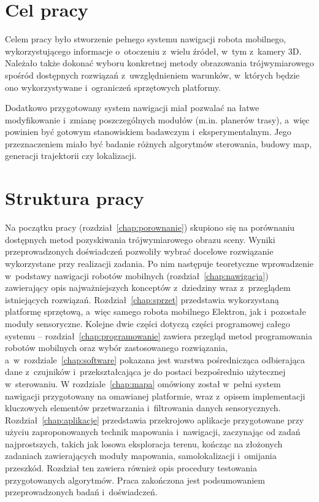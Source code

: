 \section{Cel pracy}

Celem pracy było stworzenie pełnego systemu nawigacji robota mobilnego,
wykorzystującego informacje o~otoczeniu z~wielu źródeł, w~tym z~kamery 3D.
Należało także dokonać wyboru konkretnej metody obrazowania trójwymiarowego
spośród dostępnych rozwiązań z~uwzględnieniem warunków, w~których będzie ono
wykorzystywane i~ograniczeń sprzętowych platformy.

Dodatkowo przygotowany system nawigacji miał pozwalać na łatwe modyfikowanie
i~zmianę poszczególnych modułów (m.in. planerów trasy), a~więc powinien być
gotowym stanowiskiem badawczym i~eksperymentalnym. Jego przeznaczeniem miało
być badanie różnych algorytmów sterowania, budowy map, generacji trajektorii czy lokalizacji.


\section{Struktura pracy}

Na początku pracy (rozdział~\ref{chap:porownanie}) skupiono się na porównaniu
dostępnych metod pozyskiwania trójwymiarowego
obrazu sceny. Wyniki przeprowadzonych doświadczeń pozwoliły wybrać docelowe rozwiązanie
wykorzystane przy realizacji zadania. Po nim następuje
teoretyczne wprowadzenie w~podstawy nawigacji robotów mobilnych (rozdział~\ref{chap:nawigacja})
zawierający opis najważniejszych konceptów z~dziedziny wraz z~przeglądem istniejących
rozwiązań. Rozdział~\ref{chap:sprzet} przedstawia wykorzystaną platformę sprzętową,
a~więc samego robota mobilnego Elektron, jak i~pozostałe moduły sensoryczne. Kolejne
dwie części dotyczą części programowej całego systemu -- rozdział~\ref{chap:programowanie}
zawiera przegląd metod programowania robotów mobilnych oraz wybór zastosowanego rozwiązania,
a~w~rozdziale~\ref{chap:software} pokazana jest warstwa pośrednicząca odbierająca
dane z~czujników i~przekształcająca je do postaci bezpośrednio użytecznej w~sterowaniu.
W rozdziale~\ref{chap:mapa} omówiony został w~pełni system nawigacji przygotowany
na omawianej platformie, wraz z~opisem implementacji kluczowych elementów
przetwarzania i~filtrowania danych sensorycznych.
Rozdział~\ref{chap:aplikacje} przedstawia przekrojowo aplikacje przygotowane
przy użyciu zaproponowanych technik mapowania i~nawigacji, zaczynając od zadań
najprostszych, takich jak losowa eksploracja terenu, kończąc na złożonych zadaniach
zawierających moduły mapowania, samolokalizacji i~omijania przeszkód. Rozdział ten
zawiera również opis procedury testowania przygotowanych algorytmów. Praca zakończona
jest podsumowaniem przeprowadzonych badań i~doświadczeń.


